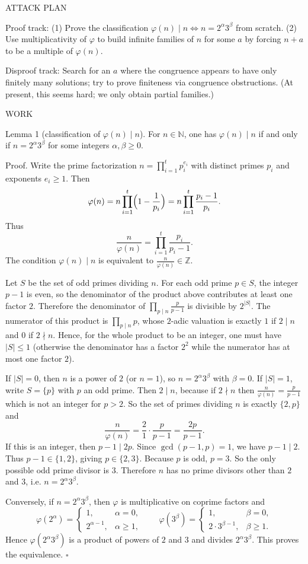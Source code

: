 ATTACK PLAN

Proof track:
(1) Prove the classification $\varphi(n)\mid n \iff n=2^\alpha 3^\beta$ from scratch.
(2) Use multiplicativity of $\varphi$ to build infinite families of $n$ for some $a$ by forcing $n+a$ to be a multiple of $\varphi(n)$.

Disproof track:
Search for an $a$ where the congruence appears to have only finitely many solutions; try to prove finiteness via congruence obstructions.
(At present, this seems hard; we only obtain partial families.)

WORK

Lemma 1 (classification of $\varphi(n)\mid n$).
For $n\in\mathbb{N}$, one has $\varphi(n)\mid n$ if and only if $n=2^\alpha 3^\beta$ for some integers $\alpha,\beta\ge0$.

Proof.
Write the prime factorization $n=\prod_{i=1}^t p_i^{e_i}$ with distinct primes $p_i$ and exponents $e_i\ge1$.
Then
\[
\varphi(n)=n\prod_{i=1}^t\Bigl(1-\frac1{p_i}\Bigr)=n\prod_{i=1}^t\frac{p_i-1}{p_i}.
\]
Thus
\[
\frac{n}{\varphi(n)}=\prod_{i=1}^t\frac{p_i}{p_i-1}.
\]
The condition $\varphi(n)\mid n$ is equivalent to $\frac{n}{\varphi(n)}\in\mathbb{Z}$.

Let $S$ be the set of odd primes dividing $n$.
For each odd prime $p\in S$, the integer $p-1$ is even, so the denominator of the product above contributes at least one factor $2$.
Therefore the denominator of $\prod_{p\mid n} \frac{p}{p-1}$ is divisible by $2^{|S|}$.
The numerator of this product is $\prod_{p\mid n} p$, whose $2$-adic valuation is exactly $1$ if $2\mid n$ and $0$ if $2\nmid n$.
Hence, for the whole product to be an integer, one must have $|S|\le 1$ (otherwise the denominator has a factor $2^2$ while the numerator has at most one factor $2$).

If $|S|=0$, then $n$ is a power of $2$ (or $n=1$), so $n=2^\alpha 3^\beta$ with $\beta=0$.
If $|S|=1$, write $S=\{p\}$ with $p$ an odd prime.
Then $2\mid n$, because if $2\nmid n$ then $\frac{n}{\varphi(n)}=\frac{p}{p-1}$ which is not an integer for $p>2$.
So the set of primes dividing $n$ is exactly $\{2,p\}$ and
\[
\frac{n}{\varphi(n)}=\frac{2}{1}\cdot \frac{p}{p-1} = \frac{2p}{p-1}.
\]
If this is an integer, then $p-1\mid 2p$.
Since $\gcd(p-1,p)=1$, we have $p-1\mid 2$.
Thus $p-1\in\{1,2\}$, giving $p\in\{2,3\}$.
Because $p$ is odd, $p=3$.
So the only possible odd prime divisor is $3$.
Therefore $n$ has no prime divisors other than $2$ and $3$, i.e.
$n=2^\alpha 3^\beta$.

Conversely, if $n=2^\alpha 3^\beta$, then $\varphi$ is multiplicative on coprime factors and
\[
\varphi(2^\alpha)=\begin{cases}1,&\alpha=0,\\2^{\alpha-1},&\alpha\ge1,\end{cases}
\qquad
\varphi(3^\beta)=\begin{cases}1,&\beta=0,\\2\cdot 3^{\beta-1},&\beta\ge1.\end{cases}
\]
Hence $\varphi(2^\alpha 3^\beta)$ is a product of powers of $2$ and $3$ and divides $2^\alpha 3^\beta$.
This proves the equivalence. $\square$

